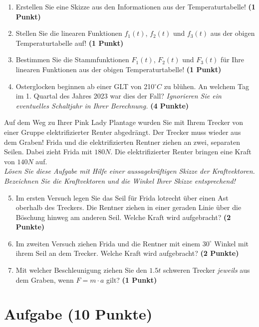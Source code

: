 \documentclass[a4paper, 9pt]{scrartcl}\usepackage[]{graphicx}\usepackage[]{xcolor}
\begin{document}
\begin{enumerate}
\item Erstellen Sie eine Skizze aus den Informationen aus der
  Temperaturtabelle!  \textbf{(1 Punkt)}
\item Stellen Sie die linearen Funktionen $f_1(t)$, $f_2(t)$ und
  $f_3(t)$ aus der obigen Temperaturtabelle auf!  \textbf{(1 Punkt)}
\item Bestimmen Sie die Stammfunktionen $F_1(t)$, $F_2(t)$ und $F_3(t)$ f{\"u}r
  Ihre linearen Funktionen aus der obigen Temperaturtabelle!  \textbf{(1
    Punkt)}
\item Osterglocken beginnen ab einer GLT von 210$^\circ C$ zu bl{\"u}hen. An
  welchem Tag im 1. Quartal des Jahres 2023 war dies der
  Fall? \textit{Ignorieren Sie ein eventuelles Schaltjahr in Ihrer Berechnung.} \textbf{(4 Punkte)}
\end{enumerate}

Auf dem Weg zu Ihrer Pink Lady Plantage wurden Sie mit Ihrem Trecker von
einer Gruppe elektrifizierter Renter abgedr{\"a}ngt. Der Trecker muss wieder
aus dem Graben! Frida und die elektrifizierten Rentner ziehen an zwei,
separaten Seilen. Dabei zieht Frida mit $180N$. Die
elektrifizierter Renter  bringen eine Kraft von $140N$ auf.\\

\textit{L{\"o}sen Sie diese Aufgabe mit Hilfe einer aussagekr{\"a}ftigen Skizze der
  Kraftvektoren. Bezeichnen Sie die Kraftvektoren und die Winkel Ihrer
  Skizze entsprechend!}

\begin{enumerate}
  \setcounter{enumi}{4}  
\item Im ersten Versuch legen Sie das Seil f{\"u}r Frida lotrecht {\"u}ber einen
  Ast oberhalb des Treckers. Die Rentner ziehen in einer geraden Linie {\"u}ber
  die B{\"o}schung hinweg am anderen Seil. Welche Kraft wird aufgebracht?
  \textbf{(2 Punkte)}
\item Im zweiten Versuch ziehen Frida und die Rentner mit einem
  $30^\circ$ Winkel mit ihrem Seil an dem Trecker. Welche Kraft
  wird aufgebracht? \textbf{(2 Punkte)}
\item Mit welcher Beschleunigung ziehen Sie den $1.5t$ schweren
  Trecker \textit{jeweils} aus dem Graben, wenn $F = m \cdot a$ gilt?
  \textbf{(1 Punkt)}
\end{enumerate}

 
\clearpage

\section{Aufgabe \hfill (10 Punkte)}
\end{document}
